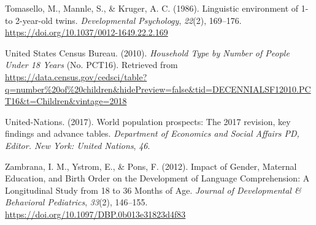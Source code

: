 \documentclass[
  man,mask,floatsintext]{apa6}
\newlength{\cslhangindent}
\newlength{\cslentryspacingunit} %
\newenvironment{CSLReferences}[2] %
 {%
  \setlength{\parindent}{0pt}
  \ifodd #1
  \let\oldpar\par
  \def\par{\hangindent=\cslhangindent\oldpar}
  \fi
  \setlength{\parskip}{#2\cslentryspacingunit}
 }%
 {}
\begin{document}
\begin{CSLReferences}{1}{0}
\leavevmode{}%
Tomasello, M., Mannle, S., \& Kruger, A. C. (1986). Linguistic environment of 1- to 2-year-old twins. \emph{Developmental Psychology}, \emph{22}(2), 169--176. \url{https://doi.org/10.1037/0012-1649.22.2.169}

\leavevmode{}%
United States Census Bureau. (2010). \emph{Household {Type} by {Number} of {People} {Under} 18 {Years}} (No. PCT16). Retrieved from \url{https://data.census.gov/cedsci/table?q=number\%20of\%20children\&hidePreview=false\&tid=DECENNIALSF12010.PCT16\&t=Children\&vintage=2018}

\leavevmode{}%
United-Nations. (2017). World population prospects: The 2017 revision, key findings and advance tables. \emph{Department of Economics and Social Affairs PD, Editor. New York: United Nations}, \emph{46}.

\leavevmode{}%
Zambrana, I. M., Ystrom, E., \& Pons, F. (2012). Impact of {Gender}, {Maternal} {Education}, and {Birth} {Order} on the {Development} of {Language} {Comprehension}: {A} {Longitudinal} {Study} from 18 to 36 {Months} of {Age}. \emph{Journal of Developmental \& Behavioral Pediatrics}, \emph{33}(2), 146--155. \url{https://doi.org/10.1097/DBP.0b013e31823d4f83}

\end{CSLReferences}

\endgroup
\end{document}
